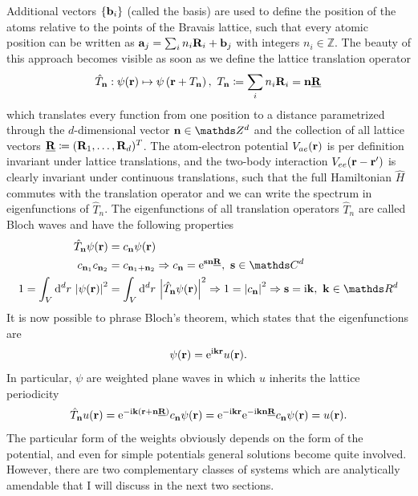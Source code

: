Additional vectors $\{{\bf b}_i\}$ (called the basis) are used to define the position of the atoms relative to the points of the Bravais lattice, such that every atomic position can be written as ${\bf a}_j = \sum_i n_i {\bf R}_i + {\bf b}_j$ with integers $n_i\in\mathds Z$.
The beauty of this approach becomes visible as soon as we define the lattice translation operator
\begin{align}
    \hat T_{\bf n} : \psi({\bf r}) \mapsto \psi\left( {\bf r}+T_{\bf n} \right),\ T_{\bf n}\coloneqq\sum_i n_i {\bf R}_i={\bf n}\underline{\bf R}
\end{align}
which translates every function from one position to a distance parametrized through the $d$-dimensional vector ${\bf n}\in\mathds Z^d$ and the collection of all lattice vectors $\underline{\bf R}\coloneqq ({\bf R}_1,\dots,{\bf R}_d)^T$.
The atom-electron potential $V_{ae}({\bf r})$ is per definition invariant under lattice translations, and the two-body interaction $V_{ee}({\bf r}-{\bf r'})$ is clearly invariant under continuous translations, such that the full Hamiltonian $\hat H$ commutes with the translation operator and we can write the spectrum in eigenfunctions of $\hat T_n$.
The eigenfunctions of all translation operators $\hat T_n$ are called Bloch waves and have the following properties
\begin{align}
    \hat T_{\bf n}\psi({\bf r}) &= c_{\bf n}\psi({\bf r})\\
    c_{{\bf n}_1}c_{{\bf n}_2} &= c_{{\bf n}_1+{\bf n}_2} \Rightarrow c_{\bf n} = \re^{{\bf s}{\bf n}\underline{\bf R}},\ {\bf s}\in\mathds C^d\\
    1=\int_V\rd^dr\,\abs{\psi({\bf r})}^2 &= \int_V\rd^dr\,\abs{\hat T_{\bf n}\psi({\bf r})}^2 \Rightarrow 1=\abs{c_{\bf n}}^2 \Rightarrow {\bf s}=\ri{\bf k},\ {\bf k}\in\mathds R^d
\end{align}
It is now possible to phrase Bloch's theorem, which states that the eigenfunctions are
\begin{align}
    \psi({\bf r}) = \mathrm e^{\mathrm i{\bf k}{\bf r}}u({\bf r}).
\end{align}
In particular, $\psi$ are weighted plane waves in which $u$ inherits the lattice periodicity
\begin{align}
    \hat T_{\bf n} u({\bf r})
    =
    \mathrm e^{-\mathrm i{\bf k}\left( {\bf r}+{\bf n}\underline{\bf R} \right)}c_{\bf n}\psi({\bf r})
    =
    \mathrm e^{-\mathrm i{\bf k}{\bf r}}\mathrm e^{-\mathrm i{\bf k}{\bf n}\underline{\bf R}}c_{\bf n}\psi({\bf r})
    =
    u({\bf r}).
\end{align}
The particular form of the weights obviously depends on the form of the potential, and even for simple potentials general solutions become quite involved.
However, there are two complementary classes of systems which are analytically amendable that I will discuss in the next two sections.
%
%

